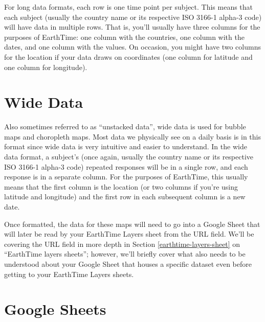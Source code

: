 \documentclass[
]{krantz}
\begin{document}
For long data formats, each row is one time point per subject. This means that each subject (usually the country name or its respective ISO 3166-1 alpha-3 code) will have data in multiple rows. That is, you'll usually have three columns for the purposes of EarthTime: one column with the countries, one column with the dates, and one column with the values. On occasion, you might have two columns for the location if your data draws on coordinates (one column for latitude and one column for longitude).

\hypertarget{wide-data}{%
\section{Wide Data}\label{wide-data}}

Also sometimes referred to as ``unstacked data'', wide data is used for bubble maps and choropleth maps. Most data we physically see on a daily basis is in this format since wide data is very intuitive and easier to understand. In the wide data format, a subject's (once again, usually the country name or its respective ISO 3166-1 alpha-3 code) repeated responses will be in a single row, and each response is in a separate column. For the purposes of EarthTime, this usually means that the first column is the location (or two columns if you're using latitude and longitude) and the first row in each subsequent column is a new date.

Once formatted, the data for these maps will need to go into a Google Sheet that will later be read by your EarthTime Layers sheet from the URL field. We'll be covering the URL field in more depth in Section \ref{earthtime-layers-sheet} on ``EarthTime layers sheets''; however, we'll briefly cover what also needs to be understood about your Google Sheet that houses a specific dataset even before getting to your EarthTime Layers sheets.

\hypertarget{google-sheets}{%
\section{Google Sheets}\label{google-sheets}}
\end{document}
